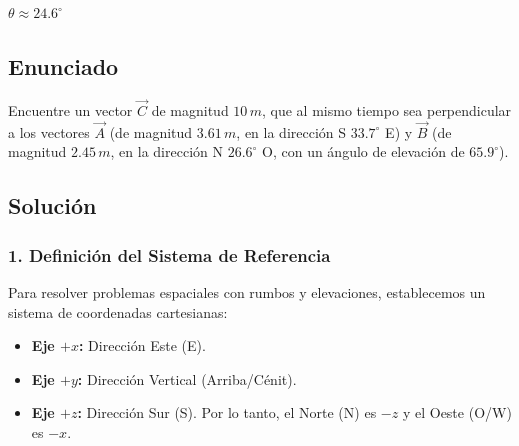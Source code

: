 \documentclass[12pt, a4paper]{article}
\begin{document}
\begin{tcolorbox}[colback=green!5!white, colframe=green!50!black, title=Respuesta Final]
\centering \Large $\theta \approx 24.6^\circ$
\end{tcolorbox}

\newpage

\subsection*{Enunciado}
Encuentre un vector $\vec{C}$ de magnitud $10 \, \si{m}$, que al mismo tiempo sea perpendicular a los vectores $\vec{A}$ (de magnitud $3.61 \, \si{m}$, en la dirección S $33.7^\circ$ E) y $\vec{B}$ (de magnitud $2.45 \, \si{m}$, en la dirección N $26.6^\circ$ O, con un ángulo de elevación de $65.9^\circ$).

\begin{center}
\end{center}

\subsection*{Solución}

\subsubsection*{1. Definición del Sistema de Referencia}
Para resolver problemas espaciales con rumbos y elevaciones, establecemos un sistema de coordenadas cartesianas:
\begin{itemize}
    \item \textbf{Eje $+x$:} Dirección Este (E).
    \item \textbf{Eje $+y$:} Dirección Vertical (Arriba/Cénit).
    \item \textbf{Eje $+z$:} Dirección Sur (S). Por lo tanto, el Norte (N) es $-z$ y el Oeste (O/W) es $-x$.
\end{itemize}
\end{document}
